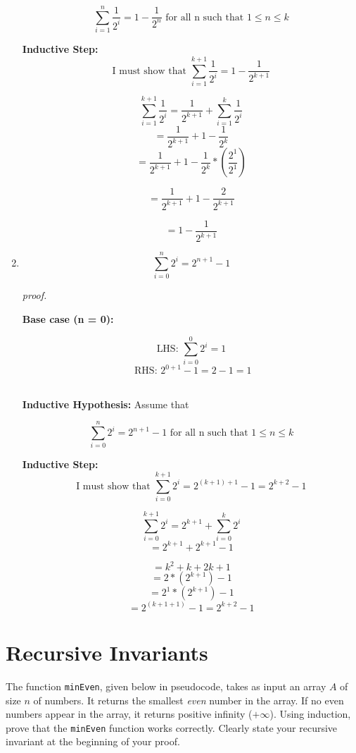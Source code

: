 \documentclass[12pt]{article}
\begin{document}
\begin{enumerate}
$$\sum_{i=1}^{n} \frac{1}{2^i} =  1 - \frac{1}{2^n} \text{   for all n such that } 1\le n \le k$$

\textbf{Inductive Step: } 
$$\text{I must show that  } \sum_{i=1}^{k+1} \frac{1}{2^i} = 1 - \frac{1}{2^{k+1}}$$

$$\sum_{i=1}^{k+1} \frac{1}{2^i} = \frac{1}{2^{k+1}}  + \sum_{i=1}^{k} \frac{1}{2^i}$$
$$ = \frac{1}{2^{k+1}} + 1 - \frac{1}{2^k} $$
$$= \frac{1}{2^{k+1}} + 1 - \frac{1}{2^k} *  \left (\frac{2^1}{2^1}\right)$$

$$= \frac{1}{2^{k+1}} + 1 - \frac{2}{2^{k+1}}$$

$$=  1 - \frac{1}{2^{k+1}}$$


\pagebreak
\item 
$$\sum_{i=0}^{n} 2^i =  2^{n + 1} - 1$$

\textit{proof.}

\textbf{Base case (n = 0):  } 

$$\text{LHS:  }\sum_{i=0}^{0}{2^i} = 1$$
$$\text{ RHS:  } 2^{0+1} - 1 = 2 -1 = 1 $$ \\


\textbf{Inductive Hypothesis: } Assume that

$$\sum_{i=0}^{n} 2^i =  2^{n + 1} - 1 \text{   for all n such that } 1\le n \le k$$

\textbf{Inductive Step: } 
$$\text{I must show that  }\sum_{i=0}^{k+1} 2^i =  2^{(k+1) + 1} - 1  = 2^{k+2} - 1$$


$$\sum_{i=0}^{k+1} 2^i = 2^{k+1} + \sum_{i=0}^{k} 2^i $$
$$ = 2^{k+ 1} + 2^{k + 1} - 1$$


$$= k^2 + k + 2k + 1$$
$$= 2 * (2^{k+1}) -1 $$
$$= 2^1 * (2^{k+1}) -1 $$
$$= 2^{(k+1+1) } -1  = 2^{k+2 } -1$$

\end{enumerate}
\pagebreak
\vspace{1cm}
\section{Recursive Invariants}
The function \texttt{minEven}, given below in pseudocode, takes as input an array $A$ of size $n$ of numbers.  It returns the smallest \textit{even} number in the array.  If no even numbers appear in the array, it returns positive infinity ($+\infty$).  Using induction, prove that the \texttt{minEven} function works correctly.  Clearly state your recursive invariant at the beginning of your proof.
\end{document}
